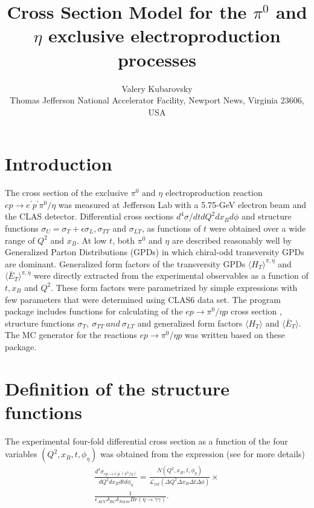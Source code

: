 \documentclass[prc,floatfix,superscriptaddress]{revtex4}
\newcommand*{\JLAB}{Thomas Jefferson National Accelerator Facility, Newport News, Virginia 23606, USA}
\newcommand{\HT}{\langle H_T \rangle}
\newcommand{\ETbar}{\langle \bar{E}_T \rangle}
\begin{document}
\title{Cross Section Model for the $\pi^0$ and $\eta$ exclusive electroproduction processes}


\author {Valery Kubarovsky\\ \JLAB} 
\maketitle
\section{Introduction}	
The cross section of the exclusive   $\pi^0$ and $\eta$ electroproduction reaction $ep\to e^\prime p^\prime \pi^0/\eta$ was measured at Jefferson Lab  with a 5.75-GeV electron beam and the CLAS detector. Differential cross sections $d^4\sigma/dtdQ^2dx_Bd\phi$ and  structure functions $\sigma_U = \sigma_T+\epsilon\sigma_L, \sigma_{TT}$ and $\sigma_{LT}$, as functions of $t$ were obtained over a wide range of $Q^2$ and $x_B$.  
At low $t$, both  $\pi^0$ and $\eta$ are described reasonably well by Generalized Parton Distributions (GPDs)  in which chiral-odd transversity GPDs are dominant. 
Generalized form factors of the transversity GPDs $\HT^{\pi,\eta}$ and $\ETbar^{\pi,\eta}$ were directly extracted from the experimental observables
as a function of  $t, x_B$ and $Q^2$.  These form factors were parametrized by simple expressions with few parameters that were determined using CLAS6 data set. The program package includes functions for calculating  of the $ep\to\pi^0/\eta p$ cross section ,  structure functions 
$\sigma_T,\ \sigma_{TT}\ and\ \sigma_{LT}$ and generalized form factors $\HT$ and $\ETbar$. The MC generator for the reactions $ep\to\pi^0/\eta p$ was written based on these package.





\section{Definition of the structure functions}

The experimental four-fold differential cross section as a function of the four variables $(Q^2,x_B,t ,\phi_\eta)$ was obtained from the expression
(see \cite{clas1,clas2,clas3} for more details)
\begin{equation}
\begin{split}
\frac{d^4 \sigma_{ep \rightarrow e^\prime p^\prime (\pi^0/\eta)}}{dQ^2 dx_B dt d\phi_\eta} = 
 \frac{N(Q^2,x_B,t,\phi_\eta)}{\mathcal{L}_{int} (\Delta Q^2  \Delta x_B \Delta t \Delta \phi)} \times \\
\frac{1}{\epsilon_{ACC}\delta_{RC} \delta_{Norm}Br(\eta\to\gamma\gamma)}.
\end{split}
\label{eq:sig_ep_eppippim}
\end{equation}
\end{document}
